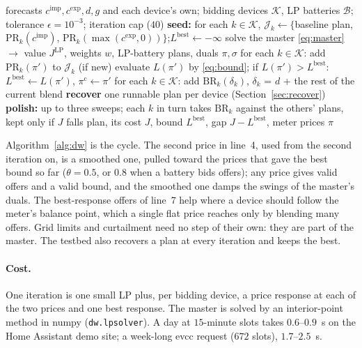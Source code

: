 \documentclass[11pt,a4paper]{article}
\newcommand{\cimp}{c^{\mathrm{imp}}}
\newcommand{\cexp}{c^{\mathrm{exp}}}
\newcommand{\PR}{\mathrm{PR}}
\newcommand{\BR}{\mathrm{BR}}
\begin{document}
\begin{algorithm}[H]
\caption{Dantzig--Wolfe planning cycle (\texttt{dw.coordinator}).}
\label{alg:dw}
\begin{algorithmic}[1]
\Require forecasts $\cimp, \cexp, d, g$ and each device's own; bidding devices
  $\mathcal K$, LP batteries $\mathcal B$; tolerance $\epsilon = 10^{-3}$;
  iteration cap ($40$)
\State \textbf{seed:} for each $k \in \mathcal K$, $\mathcal J_k \gets \{$baseline plan,
  $\PR_k(\cimp)$, $\PR_k(\max(\cexp,0))\}$;\quad $L^{\mathrm{best}} \gets -\infty$
\Repeat
  \State solve the master \eqref{eq:master} $\to$ value $J^{\mathrm{LP}}$, weights $w$,
    LP-battery plans, duals $\pi, \sigma$
    \State for each $k \in \mathcal K$: add $\PR_k(\pi')$ to $\mathcal J_k$ (if new)
    \State evaluate $L(\pi')$ by \eqref{eq:bound}; if $L(\pi') > L^{\mathrm{best}}$:
      $L^{\mathrm{best}} \gets L(\pi')$, $\pi^{\mathrm c} \gets \pi'$
  \EndFor
  \State for each $k \in \mathcal K$: add $\BR_k(\delta_k)$, $\delta_k$ = $d$ + the rest of the
    current blend 
\State \textbf{recover} one runnable plan per device (Section~\ref{sec:recover})
\State \textbf{polish:} up to three sweeps; each $k$ in turn takes $\BR_k$ against the others'
  plans, kept only if $J$ falls
\State \Return plan, its cost $J$, bound $L^{\mathrm{best}}$, gap $J - L^{\mathrm{best}}$, meter prices $\pi$
\end{algorithmic}
\end{algorithm}

Algorithm~\ref{alg:dw} is the cycle. The second price in line~4, used from the
second iteration on, is a smoothed one, pulled toward the prices that gave the
best bound so far ($\theta = 0.5$, or $0.8$ when a battery bids offers); any
price gives valid offers and a valid bound, and the smoothed one damps the swings
of the master's duals. The
best-response offers of line~7 help where a device should follow the meter's
balance point, which a single flat price reaches only by blending many offers.
Grid limits and curtailment need no step of their own: they are part of the
master. The testbed also recovers a plan at every iteration and keeps the best.

\paragraph{Cost.} One iteration is one small LP plus, per bidding device, a price
response at each of the two prices and one best response. The master is solved by an interior-point method in numpy
(\texttt{dw.lpsolver}). A day at $15$-minute slots takes $0.6$--$0.9$~s on the
Home Assistant demo site; a week-long evcc request ($672$ slots),
$1.7$--$2.5$~s.
\end{document}
